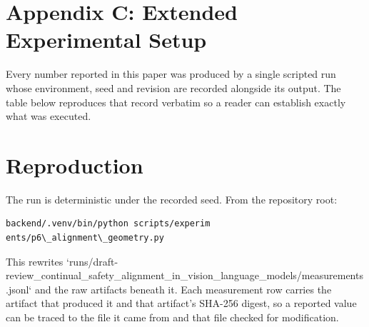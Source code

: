\documentclass[10pt,twocolumn,letterpaper]{article}
\begin{document}
\section{Appendix C: Extended Experimental Setup}


Every number reported in this paper was produced by a single scripted run whose environment, seed and revision are recorded alongside its output. The table below reproduces that record verbatim so a reader can establish exactly what was executed.
\begin{table}[htbp]
\centering
{}
\end{table}


\section{Reproduction}


The run is deterministic under the recorded seed. From the repository root:


\begin{scriptsize}
\begin{verbatim}
backend/.venv/bin/python scripts/experim
ents/p6\_alignment\_geometry.py
\end{verbatim}
\end{scriptsize}


This rewrites `runs/draft-review\_continual\_safety\_alignment\_in\_vision\_language\_models/measurements.jsonl` and the raw artifacts beneath it. Each measurement row carries the artifact that produced it and that artifact's SHA-256 digest, so a reported value can be traced to the file it came from and that file checked for modification.
\end{document}
